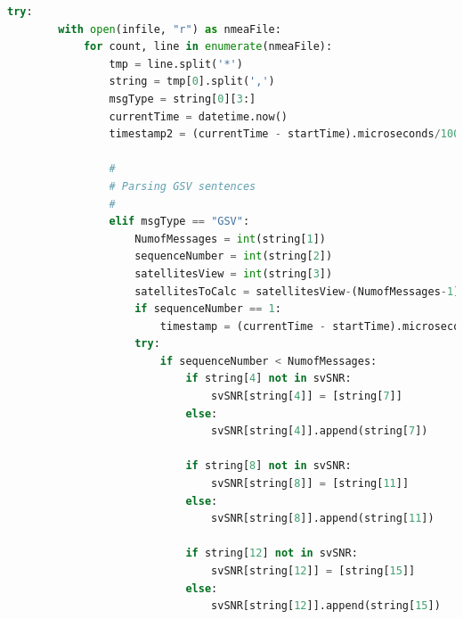 \begin{lstlisting}[language=Python, label=list:GSVParse, caption=Parsing GSV sentences for SVID carrier to noise ratio informaiton]
    try:
        with open(infile, "r") as nmeaFile:
            for count, line in enumerate(nmeaFile):
                tmp = line.split('*')
                string = tmp[0].split(',')
                msgType = string[0][3:]
                currentTime = datetime.now()
                timestamp2 = (currentTime - startTime).microseconds/1000000
    
                #
                # Parsing GSV sentences
                #
                elif msgType == "GSV":
                    NumofMessages = int(string[1])
                    sequenceNumber = int(string[2])
                    satellitesView = int(string[3])
                    satellitesToCalc = satellitesView-(NumofMessages-1)*4 # this will dictate the number the index numbers of final sentence of group
                    if sequenceNumber == 1:
                        timestamp = (currentTime - startTime).microseconds/1000000
                    try:
                        if sequenceNumber < NumofMessages:                        
                            if string[4] not in svSNR:
                                svSNR[string[4]] = [string[7]]
                            else:
                                svSNR[string[4]].append(string[7])
    
                            if string[8] not in svSNR:
                                svSNR[string[8]] = [string[11]]
                            else:
                                svSNR[string[8]].append(string[11])
                        
                            if string[12] not in svSNR:
                                svSNR[string[12]] = [string[15]]
                            else:
                                svSNR[string[12]].append(string[15])
                        

\end{lstlisting}
